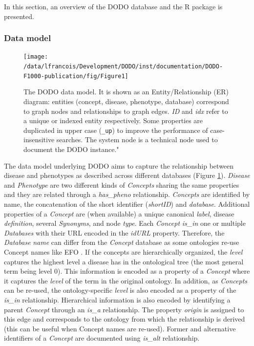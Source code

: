 \documentclass[9pt,a4paper,]{extarticle}
\begin{document}
In this section, an overview of the DODO database and the R package is presented.

\hypertarget{data-model}{%
\subsubsection{Data model}\label{data-model}}



\begin{figure}

{\centering \texttt{[image: /data/lfrancois/Development/DODO/inst/documentation/DODO-F1000-publication/fig/Figure1]} 

}

\caption{The DODO data model. It is shown as an Entity/Relationship (ER) diagram: entities (concept, disease, phenotype, database) correspond to graph nodes and relationships to graph edges. \emph{ID} and \emph{idx} refer to a unique or indexed entity respectively. Some properties are duplicated in upper case (\texttt{\_up}) to improve the performance of case-insensitive searches. The system node is a technical node used to document the DODO instance."}\label{fig:dataModel}
\end{figure}

The data model underlying DODO aims to capture the relationship between disease and phenotypes as described across different databases (Figure \ref{fig:dataModel}). \emph{Disease} and \emph{Phenotype} are two different kinds of \emph{Concepts} sharing the same properties and they are related through a \emph{has\_pheno} relationship. \emph{Concepts} are identified by name, the concatenation of the short identifier (\emph{shortID}) and \emph{database}. Additional properties of a \emph{Concept} are (when available) a unique canonical \emph{label}, disease \emph{definition}, several \emph{Synonyms}, and node \emph{type}. Each \emph{Concept} \emph{is\_in} one or multiple \emph{Databases} with their URL encoded in the \emph{idURL} property. Therefore, the \emph{Database} \emph{name} can differ from the \emph{Concept} database as some ontologies re-use Concept names like EFO \citep{Malone2010}. If the concepts are hierarchically organized, the \emph{level} captures the highest level a disease has in the ontological tree (the most general term being level 0). This information is encoded as a property of a \emph{Concept} where it captures the \emph{level} of the term in the original ontology. In addition, as \emph{Concepts} can be re-used, the ontology-specific \emph{level} is also encoded as a property of the \emph{is\_in} relationship. Hierarchical information is also encoded by identifying a parent \emph{Concept} through an \emph{is\_a} relationship. The property \emph{origin} is assigned to this edge and corresponds to the ontology from which the relationship is derived (this can be useful when Concept names are re-used). Former and alternative identifiers of a \emph{Concept} are documented using \emph{is\_alt} relationship.
\end{document}
